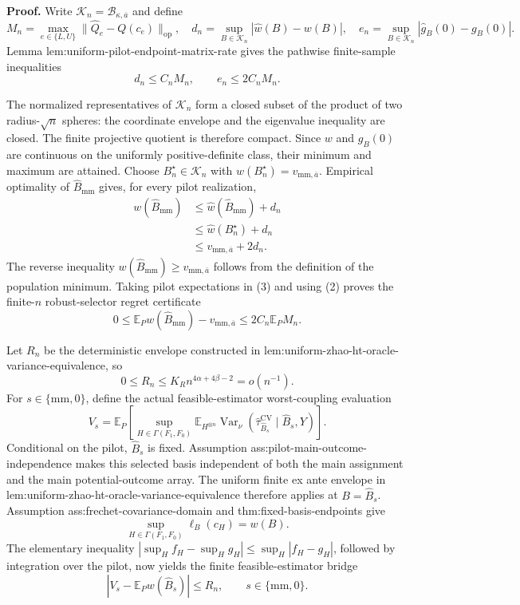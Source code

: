 \textbf{Proof.}
Write \(\mathcal K_n=\mathcal B_{\kappa,\overline a}\) and define
\[
 M_n=\max_{e\in\{L,U\}}
 \lVert\widehat Q_e-Q(c_e)\rVert_{\mathrm{op}},
 \quad
 d_n=\sup_{B\in\mathcal K_n}|\widehat w(B)-w(B)|,
 \quad
 e_n=\sup_{B\in\mathcal K_n}|\widehat g_B(0)-g_B(0)|.
 \tag{1}
\]
Lemma lem:uniform-pilot-endpoint-matrix-rate gives the pathwise finite-sample inequalities
\[
 d_n\leq C_nM_n,
 \qquad
 e_n\leq2C_nM_n.
 \tag{2}
\]

The normalized representatives of \(\mathcal K_n\) form a closed subset of the product of two radius-\(\sqrt n\) spheres: the coordinate envelope and the eigenvalue inequality are closed.  The finite projective quotient is therefore compact.  Since \(w\) and \(g_B(0)\) are continuous on the uniformly positive-definite class, their minimum and maximum are attained.  Choose \(B_n^\star\in\mathcal K_n\) with \(w(B_n^\star)=v_{\mathrm{mm},\overline a}\).  Empirical optimality of \(\widehat B_{\mathrm{mm}}\) gives, for every pilot realization,
\[
 \begin{aligned}
 w(\widehat B_{\mathrm{mm}})
 &\leq\widehat w(\widehat B_{\mathrm{mm}})+d_n\\
 &\leq\widehat w(B_n^\star)+d_n\\
 &\leq v_{\mathrm{mm},\overline a}+2d_n.
 \end{aligned}
 \tag{3}
\]
The reverse inequality \(w(\widehat B_{\mathrm{mm}})\geq v_{\mathrm{mm},\overline a}\) follows from the definition of the population minimum.  Taking pilot expectations in (3) and using (2) proves the finite-\(n\) robust-selector regret certificate
\[
 0\leq
 \mathbb E_Pw(\widehat B_{\mathrm{mm}})-v_{\mathrm{mm},\overline a}
 \leq2C_n\mathbb E_PM_n.
 \tag{4}
\]

Let \(R_n\) be the deterministic envelope constructed in lem:uniform-zhao-ht-oracle-variance-equivalence, so
\[
 0\leq R_n\leq K_Rn^{4\alpha+4\beta-2}=o(n^{-1}).
 \tag{5}
\]
For \(s\in\{\mathrm{mm},0\}\), define the actual feasible-estimator worst-coupling evaluation
\[
 V_s=
 \mathbb E_P\!\left[
 \sup_{H\in\Gamma(F_1,F_0)}
 \mathbb E_{H^{\otimes n}}
 \operatorname{Var}_\nu
 (\widehat\tau_{\widehat B_s}^{\mathrm{CV}}\mid\widehat B_s,Y)
 \right].
 \tag{6}
\]
Conditional on the pilot, \(\widehat B_s\) is fixed.  Assumption ass:pilot-main-outcome-independence makes this selected basis independent of both the main assignment and the main potential-outcome array.  The uniform finite ex ante envelope in lem:uniform-zhao-ht-oracle-variance-equivalence therefore applies at \(B=\widehat B_s\).  Assumption ass:frechet-covariance-domain and thm:fixed-basis-endpoints give
\[
 \sup_{H\in\Gamma(F_1,F_0)}\ell_B(c_H)=w(B).
 \tag{7}
\]
The elementary inequality \(|\sup_Hf_H-\sup_Hg_H|\leq\sup_H|f_H-g_H|\), followed by integration over the pilot, now yields the finite feasible-estimator bridge
\[
 |V_s-\mathbb E_Pw(\widehat B_s)|\leq R_n,
 \qquad s\in\{\mathrm{mm},0\}.
 \tag{8}
\]

